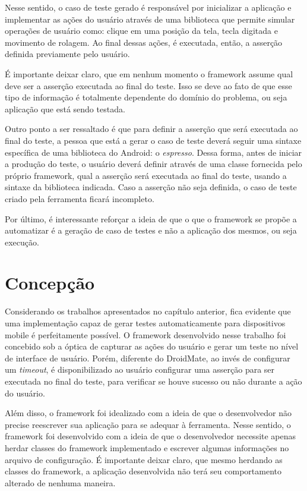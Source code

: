 \documentclass[
    12pt,       %
    openright,      %
    twoside,      %
    a4paper,      %
    english,      %
    french,       %
    spanish,      %
    brazil,       %
    ]{abntex2}
\begin{document}
        Nesse sentido, o caso de teste gerado é responsável por inicializar a aplicação e implementar as
        ações do usuário através de uma biblioteca que permite simular operações de usuário como: clique
        em uma posição da tela, tecla digitada e movimento de rolagem. Ao final dessas ações, é executada,
        então, a asserção definida previamente pelo usuário.

        É importante deixar claro, que em nenhum momento o framework assume qual deve ser a asserção
        executada ao final do teste. Isso se deve ao fato de que esse tipo de informação é totalmente
        dependente do domínio do problema, ou seja aplicação que está sendo testada.

        Outro ponto a ser ressaltado é que para definir a asserção que será executada ao final do teste,
        a pessoa que está a gerar o caso de teste deverá seguir uma sintaxe específica de uma biblioteca
        do Android: o \textit{espresso}. Dessa forma, antes de iniciar a produção do teste, o usuário
        deverá definir através de uma classe fornecida pelo próprio framework, qual a asserção será
        executada ao final do teste, usando a sintaxe da biblioteca indicada. Caso a asserção não seja
        definida, o caso de teste criado pela ferramenta ficará incompleto.

        Por último, é interessante reforçar a ideia de que o que o framework se propõe a automatizar
        é a geração de caso de testes e não a aplicação dos mesmos, ou seja execução.

      \section{Concepção}
        Considerando os trabalhos apresentados no capítulo anterior, fica evidente que uma implementação
        capaz de gerar testes automaticamente para dispositivos mobile é perfeitamente possível. O
        framework desenvolvido nesse trabalho foi concebido sob a óptica de capturar as ações do
        usuário e gerar um teste no nível de interface de usuário. Porém, diferente do DroidMate, ao invés
        de configurar um \textit{timeout}, é disponibilizado ao usuário configurar uma asserção
        para ser executada no final do teste, para verificar se houve sucesso ou não durante a ação
        do usuário.

        Além disso, o framework foi idealizado com a ideia de que o desenvolvedor não precise
        reescrever sua aplicação para se adequar à ferramenta. Nesse sentido, o framework
        foi desenvolvido com a ideia de que o desenvolvedor necessite apenas herdar classes
        do framework implementado e escrever algumas informações no arquivo de configuração.
        É importante deixar claro, que mesmo herdando as classes do framework, a aplicação
        desenvolvida não terá seu comportamento alterado de nenhuma maneira.
\end{document}
